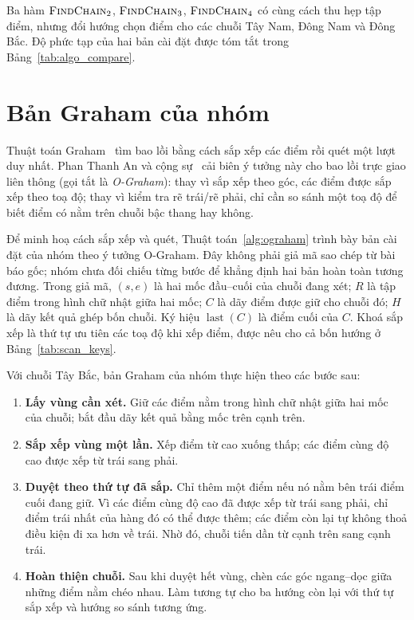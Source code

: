 Ba hàm $\textsc{FindChain}_2$, $\textsc{FindChain}_3$, $\textsc{FindChain}_4$ có cùng cách thu hẹp tập điểm, nhưng đổi hướng chọn điểm cho các chuỗi Tây Nam, Đông Nam và Đông Bắc. Độ phức tạp của hai bản cài đặt được tóm tắt trong Bảng~\ref{tab:algo_compare}.

\section{Bản Graham của nhóm}
\label{sec:ograham}
\label{sec:impl_ograham}

Thuật toán Graham~\cite{graham1972} tìm bao lồi bằng cách sắp xếp các điểm rồi quét một lượt duy nhất.
Phan Thanh An và cộng sự~\cite{an2021ograham} cải biên ý tưởng này cho bao lồi trực giao liên thông (gọi tắt là \emph{O-Graham}):
thay vì sắp xếp theo góc, các điểm được sắp xếp theo toạ độ; thay vì kiểm tra rẽ trái/rẽ phải,
chỉ cần so sánh một toạ độ để biết điểm có nằm trên chuỗi bậc thang hay không.

Để minh hoạ cách sắp xếp và quét, Thuật toán~\ref{alg:ograham} trình bày bản cài đặt của nhóm theo ý tưởng O-Graham. Đây không phải giả mã sao chép từ bài báo gốc; nhóm chưa đối chiếu từng bước để khẳng định hai bản hoàn toàn tương đương. Trong giả mã, $(s,e)$ là hai mốc đầu--cuối của chuỗi đang xét; $R$ là tập điểm trong hình chữ nhật giữa hai mốc; $C$ là dãy điểm được giữ cho chuỗi đó; $H$ là dãy kết quả ghép bốn chuỗi. Ký hiệu $\operatorname{last}(C)$ là điểm cuối của $C$. Khoá sắp xếp là thứ tự ưu tiên các toạ độ khi xếp điểm, được nêu cho cả bốn hướng ở Bảng~\ref{tab:scan_keys}.

Với chuỗi Tây Bắc, bản Graham của nhóm thực hiện theo các bước sau:
\begin{enumerate}
  \item \textbf{Lấy vùng cần xét.} Giữ các điểm nằm trong hình chữ nhật giữa hai mốc của chuỗi; bắt đầu dãy kết quả bằng mốc trên cạnh trên.
  \item \textbf{Sắp xếp vùng một lần.} Xếp điểm từ cao xuống thấp; các điểm cùng độ cao được xếp từ trái sang phải.
  \item \textbf{Duyệt theo thứ tự đã sắp.} Chỉ thêm một điểm nếu nó nằm bên trái điểm cuối đang giữ. Vì các điểm cùng độ cao đã được xếp từ trái sang phải, chỉ điểm trái nhất của hàng đó có thể được thêm; các điểm còn lại tự không thoả điều kiện đi xa hơn về trái. Nhờ đó, chuỗi tiến dần từ cạnh trên sang cạnh trái.
  \item \textbf{Hoàn thiện chuỗi.} Sau khi duyệt hết vùng, chèn các góc ngang--dọc giữa những điểm nằm chéo nhau. Làm tương tự cho ba hướng còn lại với thứ tự sắp xếp và hướng so sánh tương ứng.
\end{enumerate}

